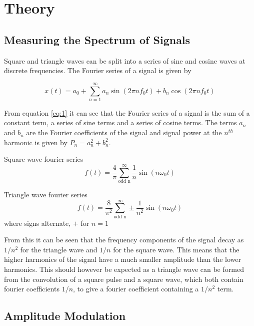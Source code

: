 \documentclass[12pt]{article}
\begin{document}
\section{Theory}

\subsection{Measuring the Spectrum of Signals}

Square and triangle waves can be split into a series of sine and cosine waves at discrete frequencies. The Fourier series of a signal is given by

\begin{equation}
    x(t) = a_0 + \sum_{n=1}^{\infty} a_n \sin(2\pi n f_0 t) + b_n \cos(2\pi n f_0 t)
    \label{eq:1}
\end{equation}

From equation \ref{eq:1} it can see that the Fourier series of a signal is the sum of a constant term, a series of sine terms and a series of cosine terms. 
The terms $a_n$ and $b_n$ are the Fourier coefficients of the signal and signal power at the $n^{th}$ harmonic is given by $P_n = a_n^2 + b_n^2$.

Square wave fourier series
\begin{equation}
    f(t) = \frac{4}{\pi} \sum_{\text{odd n}}^{\infty} \frac{1}{n} \sin\left(n \omega_0 t\right)
    \label{eq:2}
\end{equation}

Triangle wave fourier series
\begin{equation}
    f(t) = \frac{8}{\pi^2} \sum_{\text{odd n}}^{\infty} \pm \frac{1}{n^2} \sin\left(n\omega_0 t\right)
    \label{eq:3}
\end{equation}
where signs alternate, $+$ for $n = 1$

From this it can be seen that the frequency components of the signal decay as $1/n^2$ for the triangle wave and $1/n$ for the square wave. This means that the higher harmonics of the signal have a much smaller amplitude than the lower harmonics.
This should however be expected as a triangle wave can be formed from the convolution of a square pulse and a square wave, which both contain fourier coefficients $1/n$, to give a fourier coefficient containing a $1/n^2$ term.

\subsection{Amplitude Modulation}
\end{document}
